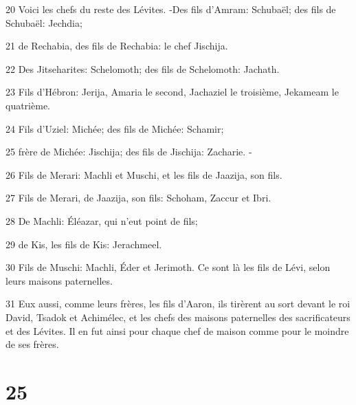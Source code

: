\par 20 Voici les chefs du reste des Lévites. -Des fils d'Amram: Schubaël; des fils de Schubaël: Jechdia;
\par 21 de Rechabia, des fils de Rechabia: le chef Jischija.
\par 22 Des Jitseharites: Schelomoth; des fils de Schelomoth: Jachath.
\par 23 Fils d'Hébron: Jerija, Amaria le second, Jachaziel le troisième, Jekameam le quatrième.
\par 24 Fils d'Uziel: Michée; des fils de Michée: Schamir;
\par 25 frère de Michée: Jischija; des fils de Jischija: Zacharie. -
\par 26 Fils de Merari: Machli et Muschi, et les fils de Jaazija, son fils.
\par 27 Fils de Merari, de Jaazija, son fils: Schoham, Zaccur et Ibri.
\par 28 De Machli: Éléazar, qui n'eut point de fils;
\par 29 de Kis, les fils de Kis: Jerachmeel.
\par 30 Fils de Muschi: Machli, Éder et Jerimoth. Ce sont là les fils de Lévi, selon leurs maisons paternelles.
\par 31 Eux aussi, comme leurs frères, les fils d'Aaron, ils tirèrent au sort devant le roi David, Tsadok et Achimélec, et les chefs des maisons paternelles des sacrificateurs et des Lévites. Il en fut ainsi pour chaque chef de maison comme pour le moindre de ses frères.

\chapter{25}

